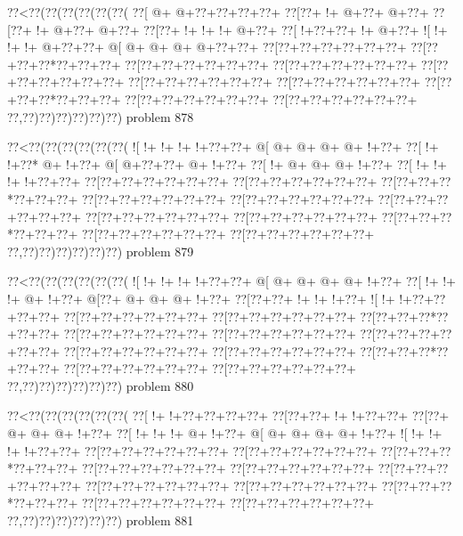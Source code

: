 \vbox{\vbox{\goo
\0??<\0??(\0??(\0??(\0??(\0??(\0??(
\0??[\- @+\- @+\0??+\0??+\0??+\0??+
\0??[\0??+\- !+\- @+\0??+\- @+\0??+
\0??[\0??+\- !+\- @+\0??+\- @+\0??+
\0??[\0??+\- !+\- !+\- !+\- @+\0??+
\0??[\- !+\0??+\0??+\- !+\- @+\0??+
\- ![\- !+\- !+\- !+\- @+\0??+\0??+
\- @[\- @+\- @+\- @+\- @+\0??+\0??+
\0??[\0??+\0??+\0??+\0??+\0??+\0??+
\0??[\0??+\0??+\0??*\0??+\0??+\0??+
\0??[\0??+\0??+\0??+\0??+\0??+\0??+
\0??[\0??+\0??+\0??+\0??+\0??+\0??+
\0??[\0??+\0??+\0??+\0??+\0??+\0??+
\0??[\0??+\0??+\0??+\0??+\0??+\0??+
\0??[\0??+\0??+\0??+\0??+\0??+\0??+
\0??[\0??+\0??+\0??*\0??+\0??+\0??+
\0??[\0??+\0??+\0??+\0??+\0??+\0??+
\0??[\0??+\0??+\0??+\0??+\0??+\0??+
\0??,\0??)\0??)\0??)\0??)\0??)\0??)
}
\hfil problem 878\hfil\break
}

\vbox{\vbox{\goo
\0??<\0??(\0??(\0??(\0??(\0??(\0??(
\- ![\- !+\- !+\- !+\- !+\0??+\0??+
\- @[\- @+\- @+\- @+\- @+\- !+\0??+
\0??[\- !+\- !+\0??*\- @+\- !+\0??+
\- @[\- @+\0??+\0??+\- @+\- !+\0??+
\0??[\- !+\- @+\- @+\- @+\- !+\0??+
\0??[\- !+\- !+\- !+\- !+\0??+\0??+
\0??[\0??+\0??+\0??+\0??+\0??+\0??+
\0??[\0??+\0??+\0??+\0??+\0??+\0??+
\0??[\0??+\0??+\0??*\0??+\0??+\0??+
\0??[\0??+\0??+\0??+\0??+\0??+\0??+
\0??[\0??+\0??+\0??+\0??+\0??+\0??+
\0??[\0??+\0??+\0??+\0??+\0??+\0??+
\0??[\0??+\0??+\0??+\0??+\0??+\0??+
\0??[\0??+\0??+\0??+\0??+\0??+\0??+
\0??[\0??+\0??+\0??*\0??+\0??+\0??+
\0??[\0??+\0??+\0??+\0??+\0??+\0??+
\0??[\0??+\0??+\0??+\0??+\0??+\0??+
\0??,\0??)\0??)\0??)\0??)\0??)\0??)
}
\hfil problem 879\hfil\break
}

\vbox{\vbox{\goo
\0??<\0??(\0??(\0??(\0??(\0??(\0??(
\- ![\- !+\- !+\- !+\- !+\0??+\0??+
\- @[\- @+\- @+\- @+\- @+\- !+\0??+
\0??[\- !+\- !+\- !+\- @+\- !+\0??+
\- @[\0??+\- @+\- @+\- @+\- !+\0??+
\0??[\0??+\0??+\- !+\- !+\- !+\0??+
\- ![\- !+\- !+\0??+\0??+\0??+\0??+
\0??[\0??+\0??+\0??+\0??+\0??+\0??+
\0??[\0??+\0??+\0??+\0??+\0??+\0??+
\0??[\0??+\0??+\0??*\0??+\0??+\0??+
\0??[\0??+\0??+\0??+\0??+\0??+\0??+
\0??[\0??+\0??+\0??+\0??+\0??+\0??+
\0??[\0??+\0??+\0??+\0??+\0??+\0??+
\0??[\0??+\0??+\0??+\0??+\0??+\0??+
\0??[\0??+\0??+\0??+\0??+\0??+\0??+
\0??[\0??+\0??+\0??*\0??+\0??+\0??+
\0??[\0??+\0??+\0??+\0??+\0??+\0??+
\0??[\0??+\0??+\0??+\0??+\0??+\0??+
\0??,\0??)\0??)\0??)\0??)\0??)\0??)
}
\hfil problem 880\hfil\break
}

\vbox{\vbox{\goo
\0??<\0??(\0??(\0??(\0??(\0??(\0??(
\0??[\- !+\- !+\0??+\0??+\0??+\0??+
\0??[\0??+\0??+\- !+\- !+\0??+\0??+
\0??[\0??+\- @+\- @+\- @+\- !+\0??+
\0??[\- !+\- !+\- !+\- @+\- !+\0??+
\- @[\- @+\- @+\- @+\- @+\- !+\0??+
\- ![\- !+\- !+\- !+\- !+\0??+\0??+
\0??[\0??+\0??+\0??+\0??+\0??+\0??+
\0??[\0??+\0??+\0??+\0??+\0??+\0??+
\0??[\0??+\0??+\0??*\0??+\0??+\0??+
\0??[\0??+\0??+\0??+\0??+\0??+\0??+
\0??[\0??+\0??+\0??+\0??+\0??+\0??+
\0??[\0??+\0??+\0??+\0??+\0??+\0??+
\0??[\0??+\0??+\0??+\0??+\0??+\0??+
\0??[\0??+\0??+\0??+\0??+\0??+\0??+
\0??[\0??+\0??+\0??*\0??+\0??+\0??+
\0??[\0??+\0??+\0??+\0??+\0??+\0??+
\0??[\0??+\0??+\0??+\0??+\0??+\0??+
\0??,\0??)\0??)\0??)\0??)\0??)\0??)
}
\hfil problem 881\hfil\break
}

